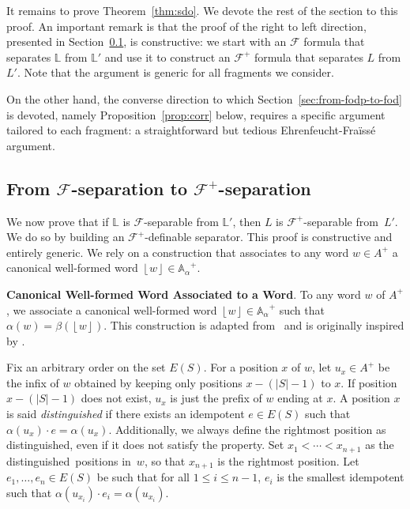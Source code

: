 \documentclass[a4paper,USenglish]{lipics}
\newcommand{\efgame}{Ehrenfeucht-Fra\"iss\'e\xspace}
\newcommand\Abb{\ensuremath{\mathbb{A}}\xspace}
\newcommand\Lbb{\ensuremath{\mathbb{L}}\xspace}
\newcommand\Fs{\ensuremath{\mathcal{F}}\xspace}
\newcommand{\croch}[1]{\ensuremath{\left\lfloor #1 \right\rfloor}\xspace}
\newcommand\wfA{\ensuremath{\Abb_\alpha}\xspace}
\newcommand\highlight[1]{\par\bigskip\noindent\textbf{\sffamily #1}.}
\theoremstyle{plain}
\begin{document}
It remains to prove Theorem~\ref{thm:sdo}. We devote the rest of the section
to this proof. An important remark is that the proof of the right to left
direction, presented in Section~\ref{sec:from-fod-to-fodp}, is constructive:
we start with an $\Fs$ formula that separates $\Lbb$ from $\Lbb'$ and use it
to construct an $\Fs^+$ formula that separates $L$ from $L'$. Note that the
argument is generic for all fragments we consider.

On the other hand, the converse direction to which
Section~\ref{sec:from-fodp-to-fod} is devoted, namely
Proposition~\ref{prop:corr} below, requires a specific argument tailored to
each fragment: a straightforward but tedious \efgame argument.

\subsection{\texorpdfstring{From $\Fs$-separation to $\Fs^+$-separation}{From F-separation to F+-separation}}
\label{sec:from-fod-to-fodp}

We now prove that if $\Lbb$ is $\Fs$-separable from $\Lbb'$, then $L$ is
$\Fs^+$-separable from~$L'$. We do so by building an $\Fs^+$-definable
separator. This proof is constructive and entirely generic. We rely on a construction
that associates to any word $w \in A^+$
a canonical well-formed word $\croch{w} \in \wfA^+$.

\highlight{Canonical Well-formed Word Associated to a Word} To any word $w$
of $A^+$, we associate a canonical well-formed word $\croch{w} \in
\wfA^+$ such that $\alpha(w) = \beta(\croch{w})$. This construction is
adapted from~\cite{PSDAD} and is originally inspired by \cite{Str85}.

Fix an arbitrary order on the set $E(S)$.
For a position $x$ of $w$, let $u_x \in A^+$ be the infix of $w$ obtained by
keeping only positions $x-(|S|-1)$ to $x$. If position $x-(|S|-1)$ does not
exist, $u_x$ is just the prefix of $w$ ending at $x$. A position $x$ is said
\emph{distinguished} if there exists an idempotent $e \in E(S)$ such that
$\alpha(u_x) \cdot e = \alpha(u_x)$. Additionally, we always define the
rightmost position as distinguished, even if it does not satisfy the
property. Set $x_1<\cdots <x_{n+1}$ as the distinguished~positions in~$w$, so
that $x_{n+1}$ is the rightmost position. Let $e_1,\dots,e_{n}\in E(S)$ be such
that for all $1\leqslant i\leqslant n-1$, $e_i$ is the smallest idempotent such that
$\alpha(u_{x_{i}}) \cdot e_i = \alpha(u_{x_{i}})$.
\end{document}
